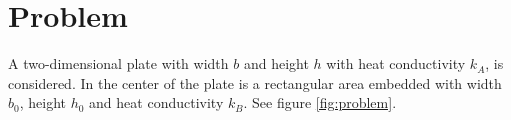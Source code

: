 \section{Problem}
A two-dimensional plate with width $b$ and height $h$ with heat conductivity $k_A$, is considered. In the center of the plate is a rectangular area embedded with width $b_0$, height $h_0$ and heat conductivity $k_B$. See figure \ref{fig:problem}. 
